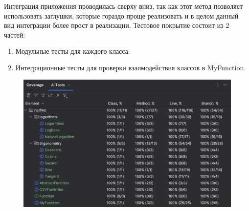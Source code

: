\documentclass[12pt,onecolumn]{article}
\begin{document}
Интеграция приложения проводилась сверху вниз, так как этот метод позволяет использовать заглушки, которые гораздо проще реализовать и в целом данный вид интеграции более прост в реализации.
Тестовое покрытие состоит из 2 частей:
\begin{enumerate}
    \item Модульные тесты для каждого класса.
    \item Интеграционные тесты для проверки взаимодействия классов в MyFunction.
\end{enumerate}
\begin{figure}[H]
    \centering
    \includegraphics[width=\textwidth]{image/coverage.png}
\end{figure}
\end{document}
